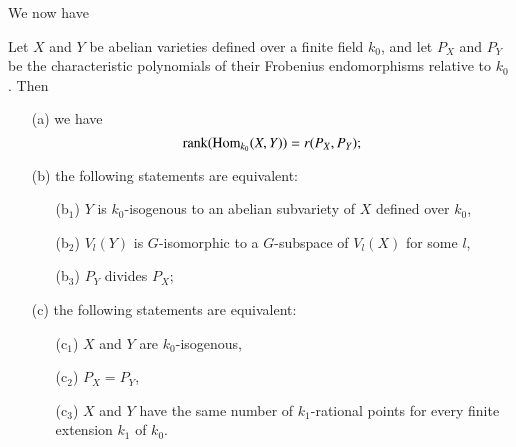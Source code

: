 We now have

\begin{thm}\label{apen1-thm2}
Let $X$ and $Y$ be abelian varieties defined over a finite field $k_0$, and let $P_X$ and $P_Y$ be the characteristic polynomials of their Frobenius endomorphisms relative to $k_0$. Then
\begin{itemize}
\item[\rm (a)] we have
$$
\operatorname{rank} (\operatorname{Hom}_{k_0} (X, Y)) = r(P_X, P_Y);
$$

\item[\rm (b)] the following statements are equivalent:
\begin{itemize}
\item[\rm (b$_1$)] $Y$ is $k_0$-isogenous to an abelian subvariety of $X$ defined over $k_0$,

\item[\rm (b$_2$)] $V_l(Y)$ is $G$-isomorphic to a $G$-subspace of $V_l(X)$ for some $l$,

\item[\rm (b$_3$)] $P_Y$ divides $P_X$;
\end{itemize}

\item[\rm (c)] the following statements are equivalent:
\begin{itemize}
\item[\rm (c$_1$)] $X$ and $Y$ are $k_0$-isogenous, 

\item[\rm (c$_2$)] $P_X = P_Y$,

\item[\rm (c$_3$)] $X$ and $Y$ have the same number of $k_1$-rational points for every finite extension $k_1$ of $k_0$.
\end{itemize}
\end{itemize}
\end{thm}

